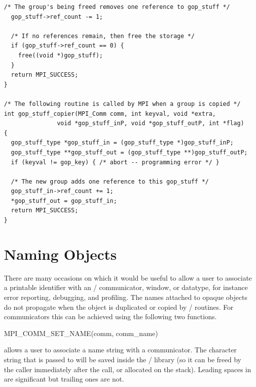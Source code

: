 \begin{lstlisting}[language={[MPI]C}]
  /* The group's being freed removes one reference to gop_stuff */
  gop_stuff->ref_count -= 1;

  /* If no references remain, then free the storage */
  if (gop_stuff->ref_count == 0) {
    free((void *)gop_stuff);
  }
  return MPI_SUCCESS;
}

/* The following routine is called by MPI when a group is copied */
int gop_stuff_copier(MPI_Comm comm, int keyval, void *extra, 
               void *gop_stuff_inP, void *gop_stuff_outP, int *flag)
{
  gop_stuff_type *gop_stuff_in = (gop_stuff_type *)gop_stuff_inP;
  gop_stuff_type **gop_stuff_out = (gop_stuff_type **)gop_stuff_outP;
  if (keyval != gop_key) { /* abort -- programming error */ }

  /* The new group adds one reference to this gop_stuff */
  gop_stuff_in->ref_count += 1;
  *gop_stuff_out = gop_stuff_in;
  return MPI_SUCCESS;
}
\end{lstlisting}

 
\section{Naming Objects}
\label{sec:ei-naming}

There are many occasions on which it would be useful to allow a user
to associate a printable identifier with an \MPI/ communicator, window, or
datatype, for instance error reporting, debugging, and profiling.
The names attached to opaque objects do not propagate when the object
is duplicated or copied by \mpi/ routines.
For communicators this can be achieved using the following two
functions.

\begin{funcdef}{MPI\_COMM\_SET\_NAME}{(\mbox{comm}, \mbox{comm\_name})}
\end{funcdef}

 allows a user to associate a name
string with a communicator. The character string that is passed to
 will be saved inside the \MPI/
library (so it can be freed by the caller immediately after the call, or
allocated on the stack).
Leading spaces in  are
significant but trailing ones are not.

